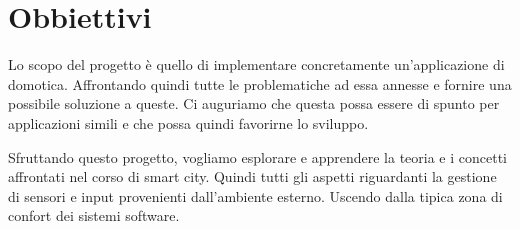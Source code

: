 \section{Obbiettivi}

Lo scopo del progetto è quello di implementare concretamente un'applicazione di domotica. Affrontando quindi tutte le problematiche ad essa annesse e fornire una possibile soluzione a queste. Ci auguriamo che questa possa essere di spunto per applicazioni simili e che possa quindi favorirne lo sviluppo.

Sfruttando questo progetto, vogliamo esplorare e apprendere la teoria e i concetti affrontati nel corso di smart city. Quindi tutti gli aspetti riguardanti la gestione di sensori e input provenienti dall'ambiente esterno. Uscendo dalla tipica zona di confort dei sistemi software.


\newpage


